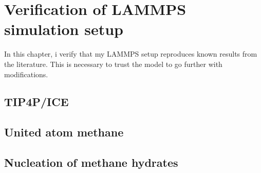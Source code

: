 \chapter{Verification of LAMMPS simulation setup}
In this chapter, i verify that my LAMMPS setup reproduces known results from the literature. This is necessary to trust the model to go further with modifications. 
\section{TIP4P/ICE}
\section{United atom methane}
\section{Nucleation of methane hydrates}
